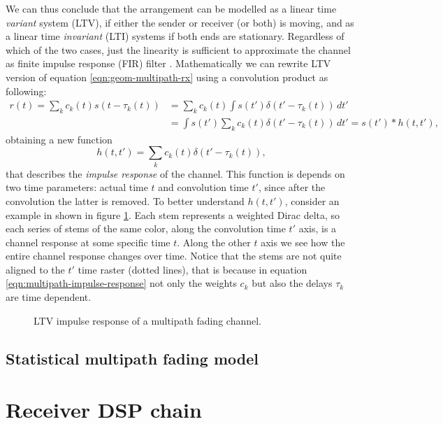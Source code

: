 We can thus conclude that the arrangement can be modelled as a linear time \emph{variant} system (LTV), if either the sender or receiver (or both) is moving, and as a linear time \emph{invariant} (LTI) systems if both ends are stationary. Regardless of which of the two cases, just the linearity is sufficient to approximate the channel as finite impulse response (FIR) filter \cite{Messier}. Mathematically we can rewrite LTV version of equation \eqref{eqn:geom-multipath-rx} using a convolution product as following:
\begin{align*}
	r(t) = \sum_k c_k(t) s(t - \tau_k(t)) &= \sum_k c_k(t) \int s(t') \delta(t' - \tau_k(t)) \,dt' \\
		&= \int s(t') \sum_k c_k(t) \delta(t' - \tau_k(t)) \,dt' = s(t') * h(t, t'),
\end{align*}
obtaining a new function
\begin{equation} \label{eqn:multipath-impulse-response}
	h(t,t') = \sum_k c_k(t) \delta(t' - \tau_k(t)),
\end{equation}
that describes the \emph{impulse response} of the channel. This function is depends on two time parameters: actual time \(t\) and convolution time \(t'\), since after the convolution the latter is removed. To better understand \(h(t,t')\), consider an example in shown in figure \ref{fig:multipath-impulse-response}. Each stem represents a weighted Dirac delta, so each series of stems of the same color, along the convolution time \(t'\) axis, is a channel response at some specific time \(t\). Along the other \(t\) axis we see how the entire channel response changes over time. Notice that the stems are not quite aligned to the \(t'\) time raster (dotted lines), that is because in equation \eqref{eqn:multipath-impulse-response} not only the weights \(c_k\) but also the delays \(\tau_k\) are time dependent.

\begin{figure}
	\centering
	
	\caption{
		LTV impulse response of a multipath fading channel.
		\label{fig:multipath-impulse-response}
	}
\end{figure}


\subsection{Statistical multipath fading model}


\section{Receiver DSP chain}
